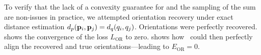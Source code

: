 
To verify that the lack of a convexity guarantee for  and the sampling of the sum are non-issues in practice, we attempted orientation recovery under exact distance estimation $d_p(\mathbf{p}_i, \mathbf{p}_j) = d_q(q_i, q_j)$.
Orientations were perfectly recovered.
 shows the convergence of the loss $L_\text{OR}$ to zero.
 shows how~ could then perfectly align the recovered and true orientations---leading to $E_\text{OR} = 0$.

